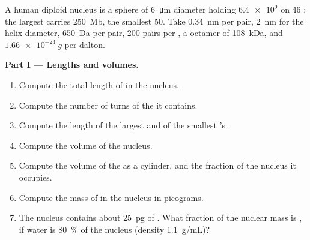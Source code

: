 \begin{problem}
\label{pb:b1:genomes:1}
A human diploid nucleus is a sphere of \qty{6}{\micro m} diameter
holding $\num{6.4e9}$  on 46 ; the largest
 carries \qty{250}{Mb}, the smallest \qty{50}{}. Take
\qty{0.34}{nm} per pair, \qty{2}{nm} for the helix diameter,
\qty{650}{Da} per pair, \num{200} pairs per , a 
octamer of \qty{108}{kDa}, and $\qty{1.66e-24}{g}$ per dalton.

\medskip
\noindent\textbf{Part I --- Lengths and volumes.}
\begin{enumerate}
  \item Compute the total length of  in the nucleus.
  \item Compute the number of turns of the  it contains.
  \item Compute the length of the largest and of the smallest
        's .
  \item Compute the volume of the nucleus.
  \item Compute the volume of the  as a cylinder, and the fraction
        of the nucleus it occupies.
  \item Compute the mass of  in the nucleus in picograms.
  \item The nucleus contains about \qty{25}{pg} of . What
        fraction of the nuclear mass is , if water is \qty{80}{\%}
        of the nucleus (density \qty{1.1}{g/mL})?
\end{enumerate}


\end{problem}
